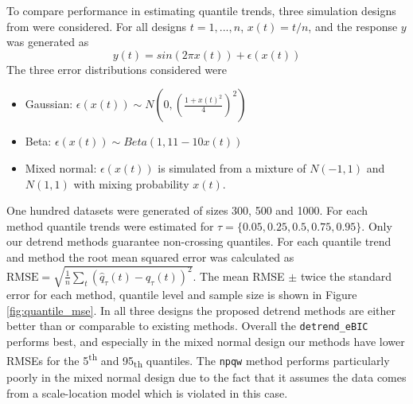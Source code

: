 \documentclass[12pt]{article}
\begin{document}
	To compare performance in estimating quantile trends, three simulation designs from \cite{Racine2017} were considered. For all designs $t = 1, ..., n$,  $x(t) = t/n$, and the response $y$ was generated as 
	$$y(t) = sin(2\pi x(t)) + \epsilon(x(t))$$
	The three error distributions considered were 
	\begin{itemize}
		\item Gaussian: $\epsilon(x(t)) \sim N\left(0, \left(\frac{1+x(t)^2}{4}\right)^2\right)$
		\item Beta: $\epsilon(x(t)) \sim Beta(1, 11-10x(t))$
		\item Mixed normal: $\epsilon(x(t))$ is simulated from a mixture of $N(-1,1)$ and  $N(1,1)$ with mixing probability $x(t)$.
	\end{itemize}
	
	One hundred datasets were generated of sizes 300, 500 and 1000. For each method quantile trends were estimated for $\tau = \{0.05, 0.25, 0.5, 0.75, 0.95\}$. Only our detrend methods guarantee non-crossing quantiles. For each quantile trend and method the root mean squared error was calculated as $\mbox{RMSE} = \sqrt{\frac{1}{n}\sum_t (\hat{q}_{\tau}(t) - q_\tau(t))^2}$. The mean RMSE $\pm$ twice the standard error for each method, quantile level and sample size is shown in Figure \ref{fig:quantile_mse}. 	In all three designs the proposed detrend methods are either better than or comparable to existing methods. Overall the \texttt{detrend\_eBIC} performs best, and especially in the mixed normal design our methods have lower RMSEs for the 5\textsuperscript{th} and 95\textsubscript{th} quantiles. The \texttt{npqw} method performs particularly poorly in the mixed normal design due to the fact that it assumes the data comes from a scale-location model which is violated in this case. 
	
\end{document}
